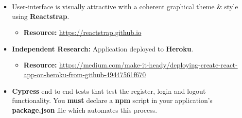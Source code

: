\documentclass{article}
\begin{document}
\begin{itemize}
        \item User-interface is visually attractive with a coherent graphical theme \& style using \textbf{Reactstrap}.
        \begin{itemize}
            \item \textbf{Resource:} \small\href{https://reactstrap.github.io}{https://reactstrap.github.io}
        \end{itemize}
        \item \textbf{Independent Research:} Application deployed to \textbf{Heroku}. 
        \begin{itemize}
            \item \textbf{Resource:} \small\href{https://medium.com/make-it-heady/deploying-create-react-app-on-heroku-from-github-49447561f670}{https://medium.com/make-it-heady/deploying-create-react-app-on-heroku-from-github-49447561f670}
        \end{itemize}
        \item \textbf{Cypress} end-to-end tests that test the register, login and logout functionality. You \textbf{must} declare a \textbf{npm} script in your application's \textbf{package.json} file which automates this process.
\end{itemize}
\end{document}
